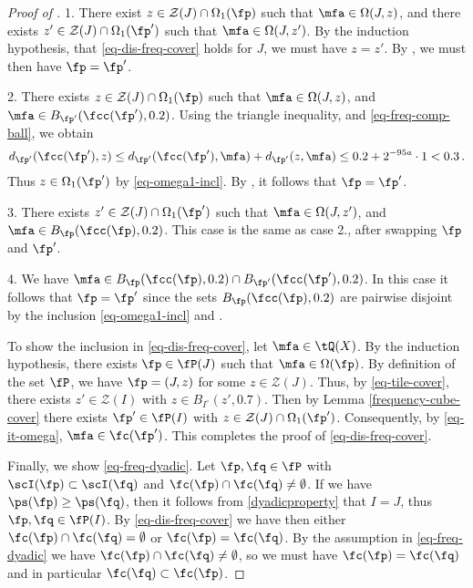 \begin{proof}[Proof of ]
    1. There exist $z \in \mathcal{Z}(J) \cap \Omega_1(\fp)$ such that $\mfa \in \Omega(J, z)$, and there exists $z' \in \mathcal{Z}(J) \cap \Omega_1(\fp')$ such that $\mfa \in \Omega(J, z')$. By the induction hypothesis, that \eqref{eq-dis-freq-cover} holds for $J$, we must have $z = z'$. By , we must then have $\fp = \fp'$.

    2. There exists $z \in \mathcal{Z}(J) \cap \Omega_1(\fp)$ such that $\mfa \in \Omega(J,z)$, and $\mfa \in B_{\fp'}(\fcc(\fp'), 0.2)$. Using the triangle inequality,  and \eqref{eq-freq-comp-ball}, we obtain
    $$
        d_{\fp'}(\fcc(\fp'),z) \le d_{\fp'}(\fcc(\fp'), \mfa) + d_{\fp'}(z, \mfa) \le 0.2 + 2^{-95a} \cdot 1 < 0.3\,.
    $$
    Thus $z \in \Omega_1(\fp')$ by \eqref{eq-omega1-incl}. By , it follows that $\fp = \fp'$.

    3. There exists $z' \in \mathcal{Z}(J) \cap \Omega_1(\fp')$ such that $\mfa \in \Omega(J,z')$, and $\mfa \in B_{\fp}(\fcc(\fp), 0.2)$. This case is the same as case 2., after swapping $\fp$ and $\fp'$.

    4. We have $\mfa \in B_{\fp}(\fcc(\fp), 0.2) \cap B_{\fp'}(\fcc(\fp'), 0.2)$. In this case it follows that $\fp = \fp'$ since the sets $B_{\fp}(\fcc(\fp), 0.2)$ are pairwise disjoint by the inclusion \eqref{eq-omega1-incl} and .

    To show the inclusion in \eqref{eq-dis-freq-cover}, let $\mfa \in \tQ(X)$. By the induction hypothesis, there exists $\fp \in \fP(J)$ such that $\mfa \in \Omega(\fp)$. By definition of the set $\fP$, we have $\fp = (J, z)$ for some $z \in \mathcal{Z}(J)$.
    Thus, by \eqref{eq-tile-cover}, there exists $z' \in \mathcal{Z}(I)$ with $z \in B_{I^\circ}(z', 0.7)$. Then by Lemma \eqref{frequency-cube-cover} there exists $\fp' \in \fP(I)$ with $z \in \mathcal{Z}(J) \cap \Omega_1(\fp')$. Consequently, by \eqref{eq-it-omega}, $\mfa \in \fc(\fp')$. This completes the proof of \eqref{eq-dis-freq-cover}.

    Finally, we show \eqref{eq-freq-dyadic}. Let $\fp, \fq \in \fP$ with $\scI(\fp) \subset \scI(\fq)$ and $\fc(\fp) \cap \fc(\fq) \ne \emptyset$. If we have $\ps(\fp) \ge \ps(\fq)$, then it follows from \eqref{dyadicproperty} that $I = J$, thus $\fp, \fq \in \fP(I)$. By \eqref{eq-dis-freq-cover} we have then either $\fc(\fp) \cap \fc(\fq) = \emptyset$ or $\fc(\fp) = \fc(\fq)$. By the assumption in \eqref{eq-freq-dyadic} we have $\fc(\fp) \cap \fc(\fq) \ne \emptyset$, so we must have $\fc(\fp) = \fc(\fq)$ and in particular $\fc(\fq) \subset \fc(\fp)$.


\end{proof}
